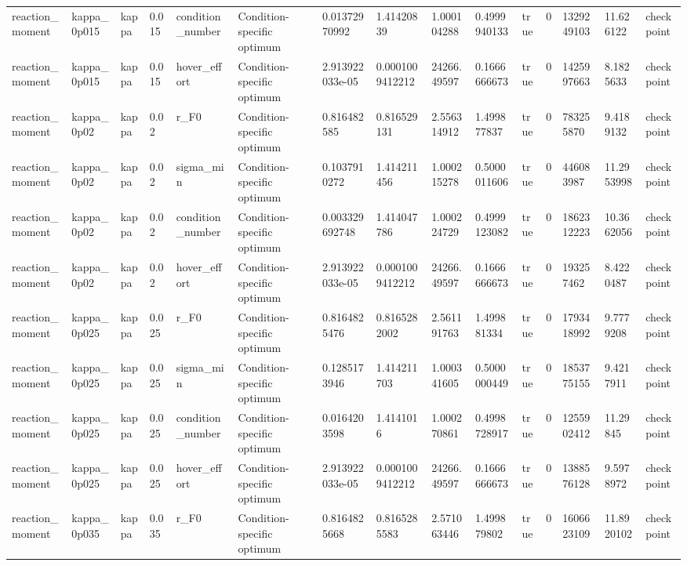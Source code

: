 \begin{tabular}{@{}lllllllllllllll@{}}
reaction\_moment & kappa\_0p015 & kappa & 0.015 & condition\_number & Condition-specific optimum & 0.01372970992 & 1.41420839 & 1.000104288 & 0.4999940133 & true & 0 & 1329249103 & 11.626122 & checkpoint \\
reaction\_moment & kappa\_0p015 & kappa & 0.015 & hover\_effort & Condition-specific optimum & 2.913922033e-05 & 0.0001009412212 & 24266.49597 & 0.1666666673 & true & 0 & 1425997663 & 8.1825633 & checkpoint \\
reaction\_moment & kappa\_0p02 & kappa & 0.02 & r\_F0 & Condition-specific optimum & 0.816482585 & 0.816529131 & 2.556314912 & 1.499877837 & true & 0 & 783255870 & 9.4189132 & checkpoint \\
reaction\_moment & kappa\_0p02 & kappa & 0.02 & sigma\_min & Condition-specific optimum & 0.1037910272 & 1.414211456 & 1.000215278 & 0.5000011606 & true & 0 & 446083987 & 11.2953998 & checkpoint \\
reaction\_moment & kappa\_0p02 & kappa & 0.02 & condition\_number & Condition-specific optimum & 0.003329692748 & 1.414047786 & 1.000224729 & 0.4999123082 & true & 0 & 1862312223 & 10.3662056 & checkpoint \\
reaction\_moment & kappa\_0p02 & kappa & 0.02 & hover\_effort & Condition-specific optimum & 2.913922033e-05 & 0.0001009412212 & 24266.49597 & 0.1666666673 & true & 0 & 193257462 & 8.4220487 & checkpoint \\
reaction\_moment & kappa\_0p025 & kappa & 0.025 & r\_F0 & Condition-specific optimum & 0.8164825476 & 0.8165282002 & 2.561191763 & 1.499881334 & true & 0 & 1793418992 & 9.7779208 & checkpoint \\
reaction\_moment & kappa\_0p025 & kappa & 0.025 & sigma\_min & Condition-specific optimum & 0.1285173946 & 1.414211703 & 1.000341605 & 0.5000000449 & true & 0 & 1853775155 & 9.4217911 & checkpoint \\
reaction\_moment & kappa\_0p025 & kappa & 0.025 & condition\_number & Condition-specific optimum & 0.0164203598 & 1.4141016 & 1.000270861 & 0.4998728917 & true & 0 & 1255902412 & 11.29845 & checkpoint \\
reaction\_moment & kappa\_0p025 & kappa & 0.025 & hover\_effort & Condition-specific optimum & 2.913922033e-05 & 0.0001009412212 & 24266.49597 & 0.1666666673 & true & 0 & 1388576128 & 9.5978972 & checkpoint \\
reaction\_moment & kappa\_0p035 & kappa & 0.035 & r\_F0 & Condition-specific optimum & 0.8164825668 & 0.8165285583 & 2.571063446 & 1.499879802 & true & 0 & 1606623109 & 11.8920102 & checkpoint \\

\end{tabular}
